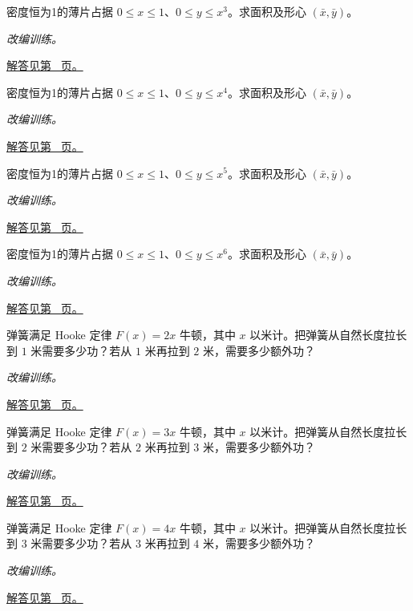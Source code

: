 \documentclass[UTF8,12pt,a4paper,fontset=fandol]{ctexart}
\begin{document}
\begin{example}[曲边梯形的形心]\label{ex:c21q15}
密度恒为1的薄片占据 $0\le x\le1$、$0\le y\le x^{3}$。求面积及形心 $(\bar x,\bar y)$。
\par\textit{改编训练。}\par\hyperref[ans:c21q15]{解答见第~\pageref{ans:c21q15} 页。}
\end{example}
\begin{example}[曲边梯形的形心]\label{ex:c21q16}
密度恒为1的薄片占据 $0\le x\le1$、$0\le y\le x^{4}$。求面积及形心 $(\bar x,\bar y)$。
\par\textit{改编训练。}\par\hyperref[ans:c21q16]{解答见第~\pageref{ans:c21q16} 页。}
\end{example}
\begin{example}[曲边梯形的形心]\label{ex:c21q17}
密度恒为1的薄片占据 $0\le x\le1$、$0\le y\le x^{5}$。求面积及形心 $(\bar x,\bar y)$。
\par\textit{改编训练。}\par\hyperref[ans:c21q17]{解答见第~\pageref{ans:c21q17} 页。}
\end{example}
\begin{example}[曲边梯形的形心]\label{ex:c21q18}
密度恒为1的薄片占据 $0\le x\le1$、$0\le y\le x^{6}$。求面积及形心 $(\bar x,\bar y)$。
\par\textit{改编训练。}\par\hyperref[ans:c21q18]{解答见第~\pageref{ans:c21q18} 页。}
\end{example}
\begin{example}[变力做功]\label{ex:c21q19}
弹簧满足 Hooke 定律 $F(x)=2x$ 牛顿，其中 $x$ 以米计。把弹簧从自然长度拉长到 $1$ 米需要多少功？若从 $1$ 米再拉到 $2$ 米，需要多少额外功？
\par\textit{改编训练。}\par\hyperref[ans:c21q19]{解答见第~\pageref{ans:c21q19} 页。}
\end{example}
\begin{example}[变力做功]\label{ex:c21q20}
弹簧满足 Hooke 定律 $F(x)=3x$ 牛顿，其中 $x$ 以米计。把弹簧从自然长度拉长到 $2$ 米需要多少功？若从 $2$ 米再拉到 $3$ 米，需要多少额外功？
\par\textit{改编训练。}\par\hyperref[ans:c21q20]{解答见第~\pageref{ans:c21q20} 页。}
\end{example}
\begin{example}[变力做功]\label{ex:c21q21}
弹簧满足 Hooke 定律 $F(x)=4x$ 牛顿，其中 $x$ 以米计。把弹簧从自然长度拉长到 $3$ 米需要多少功？若从 $3$ 米再拉到 $4$ 米，需要多少额外功？
\par\textit{改编训练。}\par\hyperref[ans:c21q21]{解答见第~\pageref{ans:c21q21} 页。}
\end{example}
\end{document}
